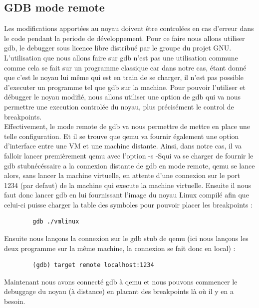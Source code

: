    \subsection{GDB mode remote}

        Les modifications apportées au noyau doivent être controlées en cas d'erreur 
        dans le code pendant la periode de développement. Pour ce faire nous allons 
        utiliser gdb, le debugger sous licence libre distribué par le groupe du 
        projet GNU. L'utilisation que nous allons faire sur gdb n'est pas une 
        utilisation commune comme cela se fait sur un programme classique car
        dans notre cas, étant donné que c'est le noyau lui même qui est en train de se
        charger, il n'est pas possible d'executer un programme tel que gdb sur la 
        machine. Pour pouvoir l'utiliser et débugger le noyau modifié, nous allons
        utiliser une option de gdb qui va nous permettre une execution controlée
        du noyau, plus précisément le control de breakpoints. \\

        Effectivement, le mode remote de gdb va nous permettre de mettre en place 
        une telle configuration. Et il se trouve que qemu va fournir également 
        une option d'interface entre une VM et une machine distante.
        Ainsi, dans notre cas, il va falloir lancer premièrement qemu avec l'option
        \og -s -S\fg qui va se charger de fournir le \og gdb stub\fg nécéssaire a la 
        connexion distante de gdb en mode remote, qemu se lance alors, sans lancer 
        la machine virtuelle, en attente d'une connexion sur le port 1234 
        (par defaut) de la machine qui execute la machine virtuelle.
        Ensuite il nous faut donc lancer gdb en lui fournissant l'image du noyau 
        Linux compilé afin que celui-ci puisse charger la table des symboles 
        pour pouvoir placer les breakpoints :
        \begin{lstlisting}
        gdb ./vmlinux
        \end{lstlisting}
        Ensuite nous lançons la connexion sur le gdb stub de qemu (ici nous lançons 
        les deux programme sur la même machine, la connexion se fait donc en local) :
        \begin{lstlisting}
        (gdb) target remote localhost:1234
        \end{lstlisting}
        Maintenant nous avons connecté gdb à qemu et nous pouvons commencer le 
        debuggage du noyau (à distance) en placant des breakpoints là où il y en a
        besoin.

